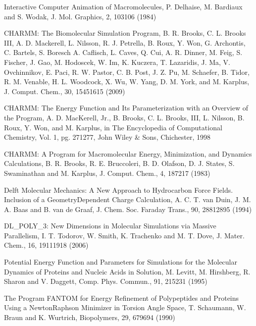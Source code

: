 \documentclass[letterpaper,11pt,english]{sphinxmanual}
\begin{document}

Interactive Computer Animation of Macromolecules, P. Delhaise, M. Bardiaux and S. Wodak, J. Mol. Graphics, 2, 103\sphinxhyphen{}106 (1984)


CHARMM: The Biomolecular Simulation Program, B. R. Brooks, C. L. Brooks III, A. D. Mackerell, L. Nilsson, R. J. Petrella, B. Roux, Y. Won, G. Archontis, C. Bartels, S. Boresch A. Caflisch, L. Caves, Q. Cui, A. R. Dinner, M. Feig, S. Fischer, J. Gao, M. Hodoscek, W. Im, K. Kuczera, T. Lazaridis, J. Ma, V. Ovchinnikov, E. Paci, R. W. Pastor, C. B. Post, J. Z. Pu, M. Schaefer, B. Tidor, R. M. Venable, H. L. Woodcock, X. Wu, W. Yang, D. M. York, and M. Karplus, J. Comput. Chem., 30, 1545\sphinxhyphen{}1615 (2009)

CHARMM: The Energy Function and Its Parameterization with an Overview of the Program, A. D. MacKerell, Jr., B. Brooks, C. L. Brooks, III, L. Nilsson, B. Roux, Y. Won, and M. Karplus, in The Encyclopedia of Computational Chemistry, Vol. 1, pg. 271\sphinxhyphen{}277, John Wiley \& Sons, Chichester, 1998

CHARMM: A Program for Macromolecular Energy, Minimization, and Dynamics Calculations, B. R. Brooks, R. E. Bruccoleri, B. D. Olafson, D. J. States, S. Swaminathan and M. Karplus, J. Comput. Chem., 4, 187\sphinxhyphen{}217 (1983)


Delft Molecular Mechanics: A New Approach to Hydrocarbon Force Fields. Inclusion of a Geometry\sphinxhyphen{}Dependent Charge Calculation, A. C. T. van Duin, J. M. A. Baas  and B. van de Graaf, J. Chem. Soc. Faraday Trans., 90, 2881\sphinxhyphen{}2895 (1994)


DL\_POLY\_3: New Dimensions in Molecular Simulations via Massive Parallelism, I. T. Todorov, W. Smith, K. Trachenko and M. T. Dove, J. Mater. Chem., 16, 1911\sphinxhyphen{}1918 (2006)


Potential Energy Function and Parameters for Simulations for the Molecular Dynamics of Proteins and Nucleic Acids in Solution, M. Levitt, M. Hirshberg, R. Sharon and V. Daggett, Comp. Phys. Commun., 91, 215\sphinxhyphen{}231 (1995)


The Program FANTOM for Energy Refinement of Polypeptides and Proteins Using a Newton\sphinxhyphen{}Raphson Minimizer in Torsion Angle Space, T. Schaumann, W. Braun and K. Wurtrich, Biopolymers, 29, 679\sphinxhyphen{}694 (1990)
\end{document}
